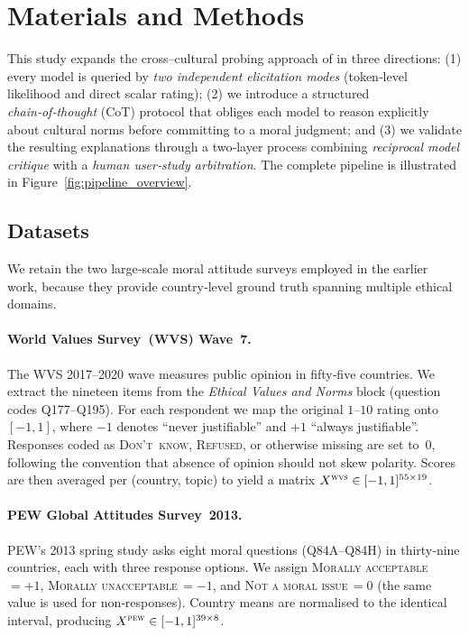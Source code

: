 \documentclass[11pt]{article}
\begin{document}
\section{Materials and Methods}
\label{sec:methods}

This study expands the cross–cultural probing approach of \citet{mohammadi2025exploring} in three directions:  
(1) every model is queried by \emph{two independent elicitation modes} (token‑level likelihood and direct scalar rating);  
(2) we introduce a structured \emph{chain‑of‑thought} (CoT) protocol that obliges each model to reason explicitly about cultural norms before committing to a moral judgment; and  
(3) we validate the resulting explanations through a two‑layer process combining \emph{reciprocal model critique} with a \emph{human user‑study arbitration}.  
The complete pipeline is illustrated in Figure~\ref{fig:pipeline_overview}.

\subsection{Datasets}
\label{sec:data}

We retain the two large‑scale moral attitude surveys employed in the earlier work, because they provide country‑level ground truth spanning multiple ethical domains.

\paragraph{World Values Survey (WVS) Wave 7.}
The WVS 2017–2020 wave measures public opinion in fifty‑five countries.  
We extract the nineteen items from the \textit{Ethical Values and Norms} block (question codes Q177–Q195).  
For each respondent we map the original $1$–$10$ rating onto $[-1,1]$, where $-1$ denotes “never justifiable” and $+1$ “always justifiable”.  
Responses coded as \textsc{Don’t know}, \textsc{Refused}, or otherwise missing are set to~0, following the convention that absence of opinion should not skew polarity.  
Scores are then averaged per (country, topic) to yield a matrix
$X^{\textsc{wvs}}\in[-1,1]^{55\times19}$.

\paragraph{PEW Global Attitudes Survey 2013.}
PEW’s 2013 spring study asks eight moral questions (Q84A–Q84H) in thirty‑nine countries, each with three response options.  
We assign \textsc{Morally acceptable}\,$=+1$, \textsc{Morally unacceptable}\,$=-1$, and \textsc{Not a moral issue}\,$=0$ (the same value is used for non‑responses).  
Country means are normalised to the identical interval, producing
$X^{\textsc{pew}}\in[-1,1]^{39\times8}$.
\end{document}

